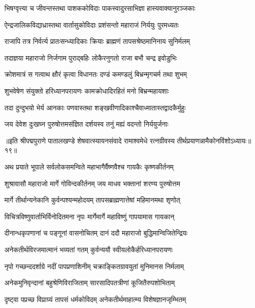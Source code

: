 \twolineshloka
{भिषग्वृत्त्या च जीवन्तस्तथा पाशककोविदाः}
{पाकस्वादुरसाभिज्ञा हास्यवाक्यानुरञ्जकाः}%

\twolineshloka
{ऐन्द्रजालिकविद्याध्रास्तथा वार्तासुकोविदाः}
{प्रशंसन्तो महाराजं निर्ययुः पुरमध्यतः}%

\twolineshloka
{राजापि तत्र निर्वर्त्य प्रातःसन्ध्यादिकाः क्रियाः}
{ब्राह्मणं तापसश्रेष्ठमानिनाय सुनिर्मलम्}%

\twolineshloka
{तदाज्ञया महाराजो निर्जगाम पुराद्बहिः}
{लोकैरनुगतो राजा बभौ चन्द्र इवोडुभिः}%

\twolineshloka
{क्रोशमात्रं स गत्वाथ क्षौरं कृत्वा विधानतः}
{दण्डं कमण्डलुं बिभ्रन्मृगचर्म तथा शुभम्}%

\twolineshloka
{शुभवेषेण संयुक्तो हरिध्यानपरायणः}
{कामक्रोधादिरहितं मनो बिभ्रन्महायशाः}%

\twolineshloka
{तदा दुन्दुभयो भेर्य आनकाः पणवास्तथा}
{शङ्खवीणादिकाश्चैवाध्मातास्तद्वादकैर्मुहुः}%

\twolineshloka
{जय देवेश दुःखघ्न पुरुषोत्तमसंज्ञित}
{दर्शयस्व तनुं मह्यं वदन्तो निर्ययुर्जनाः}%

{॥इति श्रीपद्मपुराणे पातालखण्डे शेषवात्स्यायनसंवादे रामाश्वमेधे रत्नग्रीवस्य तीर्थप्रयाणन्नामैकोनविंशोऽध्यायः॥१९॥}

\resetShloka


\twolineshloka
{अथ प्रयाते भूपाले सर्वलोकसमन्विते}
{महाभागैर्वैष्णवैश्च गायकैः कृष्णकीर्तनम्}%

\twolineshloka
{शुश्रावासौ महाराजो मार्गे गोविन्दकीर्तनम्}
{जय माधव भक्तानां शरण्य पुरुषोत्तम}%

\twolineshloka
{मार्गे तीर्थान्यनेकानि कुर्वन्पश्यन्महोदयम्}
{तापसब्राह्मणात्तेषां महिमानमथा शृणोत्}%

\twolineshloka
{विचित्रविष्णुवार्ताभिर्विनोदितमना नृपः}
{मार्गेमार्गे महाविष्णुं गापयामास गायकान्}%

\twolineshloka
{दीनान्धकृपणानां च पङ्गूनां वासनोचितम्}
{दानं ददौ महाराजो बुद्धिमान्विजितेन्द्रियः}%

\twolineshloka
{अनेकतीर्थविरजमात्मानं भव्यतां गतम्}
{कुर्वन्ययौ स्वीयलोकैर्हरिध्यानपरायणः}%

\twolineshloka
{नृपो गच्छन्ददर्शाग्रे नदीं पापप्रणाशिनीम्}
{चक्राङ्कितग्रावयुतां मुनिमानस निर्मलाम्}%

\twolineshloka
{अनेकमुनिवृन्दानां बहुश्रेणिविराजिताम्}
{सारसादिपतत्रीणां कूजितैरुपशोभिताम्}%

\twolineshloka
{दृष्ट्वा पप्रच्छ विप्राग्र्यं तापसं धर्मकोविदम्}
{अनेकतीर्थमाहात्म्य विशेषज्ञानजृम्भितम्}%

